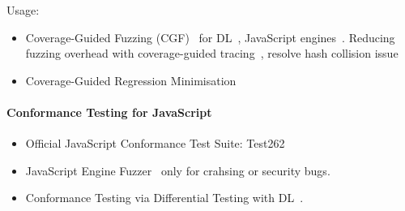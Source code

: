 Usage:
\begin{itemize}
  \item Coverage-Guided Fuzzing (CGF)~\cite{afl} for DL~\cite{cov-fuzz-dl,
    cov-fuzz-tensor}, JavaScript engines~\cite{fuzzil}. Reducing fuzzing
    overhead with coverage-guided tracing~\cite{cov-trace}, resolve hash
    collision issue~\cite{cov-fuzz-collision}
  \item Coverage-Guided Regression
    Minimisation~\cite{regression-minimize-survey}
\end{itemize}


\paragraph{\textbf{Conformance Testing for JavaScript}}
\begin{itemize}
  \item Official JavaScript Conformance Test Suite: Test262~\cite{test262}
  \item JavaScript Engine Fuzzer~\cite{montage, langfuzz, die, favocado,
      codealchemist, sofi, comfort, superion, fuzzilli, jsfunfuzz,
    ifuzzer} only for crahsing or security bugs.
  \item Conformance Testing via Differential Testing with DL~\cite{comfort}.
\end{itemize}

\todo
